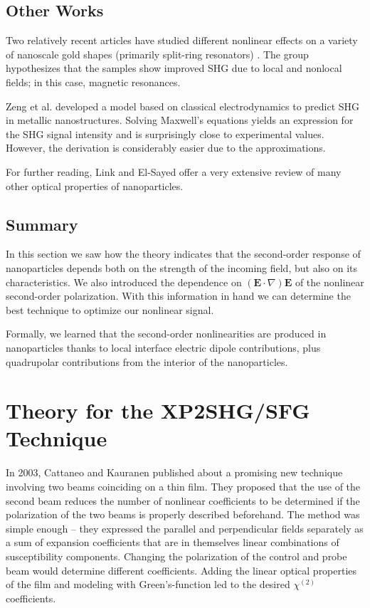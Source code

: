 \subsection{Other Works}
Two relatively recent articles have studied different nonlinear effects on a variety of nanoscale gold shapes (primarily split-ring resonators) \cite{klein2007experiments, feth2008second}. The group hypothesizes that the samples show improved SHG due to local and nonlocal fields; in this case, magnetic resonances.

Zeng et al. \cite{zeng2009classical} developed a model based on classical electrodynamics to predict SHG in metallic nanostructures. Solving Maxwell's equations yields an expression for the SHG signal intensity and is surprisingly close to experimental values. However, the derivation is considerably easier due to the approximations.

For further reading, Link and El-Sayed \cite{link2003optical} offer a very extensive review of many other optical properties of nanoparticles.

\subsection{Summary}
In this section we saw how the theory indicates that the second-order response of nanoparticles depends both on the strength of the incoming field, but also on its characteristics. We also introduced the dependence on $\left(\mathbf{E}\cdot\nabla\right)\mathbf{E}$ of the nonlinear second-order polarization. With this information in hand we can determine the best technique to optimize our nonlinear signal.

Formally, we learned that the second-order nonlinearities are produced in nanoparticles thanks to local interface electric dipole contributions, plus quadrupolar contributions from the interior of the nanoparticles.

\section{Theory for the XP2SHG/SFG Technique}\label{chap_theory_xp2}
In 2003, Cattaneo and Kauranen \cite{cattaneo2003determination} published about a promising new technique involving two beams coinciding on a thin film. They proposed that the use of the second beam reduces the number of nonlinear coefficients to be determined if the polarization of the two beams is properly described beforehand. The method was simple enough -- they expressed the parallel and perpendicular fields separately as a sum of expansion coefficients that are in themselves linear combinations of susceptibility components. Changing the polarization of the control and probe beam would determine different coefficients. Adding the linear optical properties of the film and modeling with Green's-function led to the desired $\chi^{(2)}$ coefficients.

